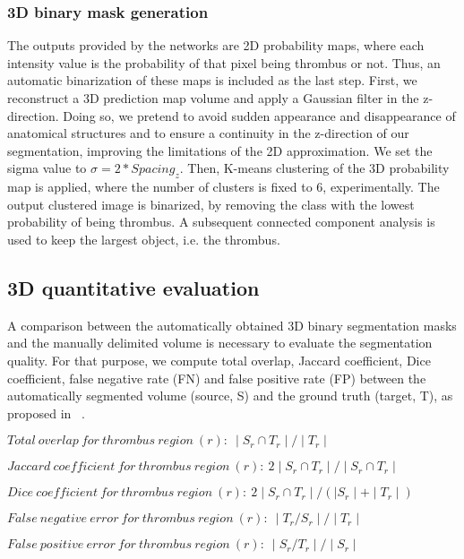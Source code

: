 \documentclass[preprint,authoryear,12pt]{elsarticle}
\begin{document}
\subsubsection*{3D binary mask generation} 
The outputs provided by the networks are 2D probability maps, where each intensity value is the probability of that pixel being thrombus or not. Thus, an automatic binarization of these maps is included as the last step. First, we reconstruct a 3D prediction map volume and apply a Gaussian filter in the z-direction. Doing so, we pretend to avoid sudden appearance and disappearance of anatomical structures and to ensure a continuity in the z-direction of our segmentation, improving the limitations of the 2D approximation. We set the sigma value to \(\sigma = 2*Spacing_{z}\). Then, K-means clustering of the 3D probability map is applied, where the number of clusters is fixed to 6, experimentally. The output clustered image is binarized, by removing the class with the lowest probability of being thrombus. A subsequent connected component analysis is used to keep the largest object, i.e. the thrombus.

\subsection{3D quantitative evaluation}
A comparison between the automatically obtained 3D binary segmentation masks and the manually delimited volume is necessary to evaluate the segmentation quality. For that purpose, we compute total overlap, Jaccard coefficient, Dice coefficient, false negative rate (FN) and false positive rate (FP) between the automatically segmented volume (source, S) and the ground truth (target, T), as proposed in ~\citep{itk}. \newline \par
\(Total\ overlap\ for\ thrombus\ region\ (r):\ \mid S_{r} \cap T_{r} \mid / \mid T_{r} \mid\) \par
\(Jaccard\ coefficient\ for\ thrombus\ region\ (r):\ 2 \mid S_{r} \cap T_{r} \mid / \mid S_{r} \cap T_{r} \mid\) \par
\(Dice\ coefficient\ for\ thrombus\ region\ (r):\ 2 \mid S_{r} \cap T_{r} \mid / (\mid S_{r} \mid + \mid T_{r} \mid) \) \par
\(False\ negative\ error\ for\  thrombus\ region\ (r):\ \mid T_{r}/S_{r} \mid / \mid T_{r} \mid\)\par
\(False\ positive\ error\ for\ thrombus\ region\ (r):\ \mid S_{r}/T_{r} \mid / \mid S_{r} \mid\)
\end{document}
